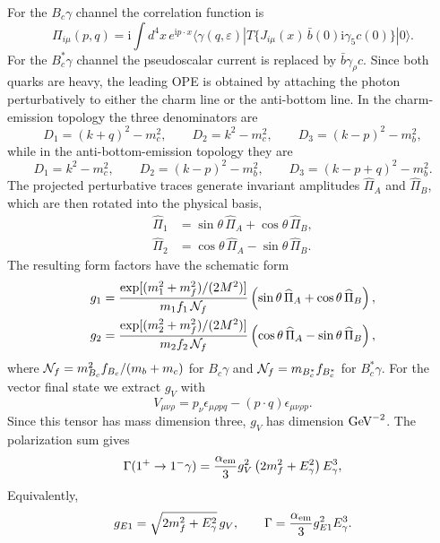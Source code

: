 \documentclass[aps,prd,preprint,nofootinbib,superscriptaddress]{revtex4-2}
\newcommand{\ii}{\mathrm{i}}
\newcommand{\Bc}{B_c}
\newcommand{\Bcst}{B_c^\ast}
\begin{document}
For the \(\Bc\gamma\) channel the correlation function is
\begin{equation}
  \Pi_{i\mu}(p,q)=\ii\int d^4x\,e^{\ii p\cdot x}
  \langle \gamma(q,\varepsilon)|
  T\{J_{i\mu}(x)\,\bar b(0)\ii\gamma_5 c(0)\}|0\rangle .
  \label{eq:ps-correlator}
\end{equation}
For the \(\Bcst\gamma\) channel the pseudoscalar current is replaced by
\(\bar b\gamma_\rho c\).  Since both quarks are heavy, the leading OPE is
obtained by attaching the photon perturbatively to either the charm line or
the anti-bottom line.  In the charm-emission topology the three denominators
are
\begin{equation}
  D_1=(k+q)^2-m_c^2,\qquad D_2=k^2-m_c^2,\qquad
  D_3=(k-p)^2-m_b^2 ,
  \label{eq:c-denominators}
\end{equation}
while in the anti-bottom-emission topology they are
\begin{equation}
  D_1=k^2-m_c^2,\qquad D_2=(k-p)^2-m_b^2,\qquad
  D_3=(k-p+q)^2-m_b^2 .
  \label{eq:b-denominators}
\end{equation}
The projected perturbative traces generate invariant amplitudes
\(\widehat\Pi_A\) and \(\widehat\Pi_B\), which are then rotated into the
physical basis,
\begin{align}
  \widehat\Pi_1 &= \sin\theta\,\widehat\Pi_A+\cos\theta\,\widehat\Pi_B,\\
  \widehat\Pi_2 &= \cos\theta\,\widehat\Pi_A-\sin\theta\,\widehat\Pi_B .
  \label{eq:rotate-pi}
\end{align}
The resulting form factors have the schematic form
\begin{align}
  g_1 &=
  \frac{\exp[(m_1^2+m_f^2)/(2M^2)]}{m_1 f_1\,{\cal N}_f}
  \left(\sin\theta\,\widehat\Pi_A+\cos\theta\,\widehat\Pi_B\right),\\
  g_2 &=
  \frac{\exp[(m_2^2+m_f^2)/(2M^2)]}{m_2 f_2\,{\cal N}_f}
  \left(\cos\theta\,\widehat\Pi_A-\sin\theta\,\widehat\Pi_B\right),
  \label{eq:sumrule-form}
\end{align}
where \({\cal N}_f=m_{\Bc}^2 f_{\Bc}/(m_b+m_c)\) for \(\Bc\gamma\) and
\({\cal N}_f=m_{\Bcst}f_{\Bcst}\) for \(\Bcst\gamma\).
For the vector final state we extract \(g_V\) with
\[
V_{\mu\nu\rho}=p_\nu\epsilon_{\mu\rho pq}
-(p\cdot q)\epsilon_{\mu\nu\rho p}.
\]
Since this tensor has mass dimension three, \(g_V\) has dimension
\({\rm GeV}^{-2}\).  The polarization sum gives
\[
\Gamma(1^+\to1^-\gamma)=
\frac{\alpha_{\rm em}}{3}g_V^2
\left(2m_f^2+E_\gamma^2\right)E_\gamma^3,
\]
Equivalently,
\[
g_{E1}=\sqrt{2m_f^2+E_\gamma^2}\,g_V,\qquad
\Gamma=\frac{\alpha_{\rm em}}{3}g_{E1}^2E_\gamma^3 .
\]
\end{document}
